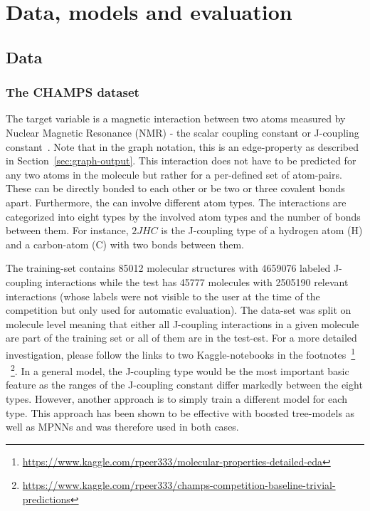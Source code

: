 \chapter{Data, models and evaluation}
\label{chapter:Methods}


\section{Data}
\label{sec:data-and-features}


\subsection{The CHAMPS dataset}
\label{sec:champs-dataset}

The target variable is a magnetic interaction between two atoms measured by Nuclear Magnetic Resonance (NMR) - the scalar coupling constant or J-coupling constant~\cite{NMR}.
Note that in the graph notation, this is an edge-property as described in Section~\ref{sec:graph-output}. This interaction does not have to be predicted for any two atoms in the molecule but rather for a per-defined set of atom-pairs. These can be directly bonded to each other or be two or three covalent bonds apart. Furthermore, the can involve different atom types. The interactions are categorized into eight types by the involved atom types and the number of bonds between them. For instance, $2JHC$ is the J-coupling type of a hydrogen atom (H) and a carbon-atom (C) with two bonds between them.

The training-set contains 85012 molecular structures with 4659076 labeled J-coupling interactions while the test has 45777 molecules with 2505190 relevant interactions (whose labels were not visible to the user at the time of the competition but only used for automatic evaluation). The data-set was split on molecule level meaning that either all J-coupling interactions in a given molecule are part of the training set or all of them are in the test-est. For a more detailed investigation, please follow the links to two Kaggle-notebooks in the footnotes~\footnote{\url{https://www.kaggle.com/rpeer333/molecular-properties-detailed-eda}}
~\footnote{\url{https://www.kaggle.com/rpeer333/champs-competition-baseline-trivial-predictions}}.
In a general model, the J-coupling type would be the most important basic feature as the ranges of the J-coupling constant differ markedly between the eight types. However, another approach is to simply train a different model for each type. This approach has been shown to be effective with boosted tree-models as well as MPNNs and was therefore used in both cases.

